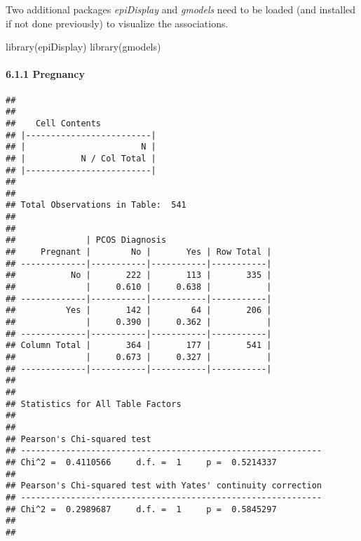 \documentclass[
]{article}
\newenvironment{Shaded}{\begin{snugshade}}{\end{snugshade}}
\newcommand{\AttributeTok}[1]{\textcolor[rgb]{0.77,0.63,0.00}{#1}}
\newcommand{\CommentTok}[1]{\textcolor[rgb]{0.56,0.35,0.01}{\textit{#1}}}
\newcommand{\ConstantTok}[1]{\textcolor[rgb]{0.00,0.00,0.00}{#1}}
\newcommand{\FloatTok}[1]{\textcolor[rgb]{0.00,0.00,0.81}{#1}}
\newcommand{\FunctionTok}[1]{\textcolor[rgb]{0.00,0.00,0.00}{#1}}
\newcommand{\NormalTok}[1]{#1}
\newcommand{\OtherTok}[1]{\textcolor[rgb]{0.56,0.35,0.01}{#1}}
\newcommand{\SpecialCharTok}[1]{\textcolor[rgb]{0.00,0.00,0.00}{#1}}
\newcommand{\StringTok}[1]{\textcolor[rgb]{0.31,0.60,0.02}{#1}}
\begin{document}
Two additional packages \emph{epiDisplay} and \emph{gmodels} need to be
loaded (and installed if not done previously) to visualize the
associations.

\begin{Shaded}
\begin{Highlighting}[]
\FunctionTok{library}\NormalTok{(epiDisplay)}
\FunctionTok{library}\NormalTok{(gmodels)}
\end{Highlighting}
\end{Shaded}

\hypertarget{pregnancy}{%
\paragraph{6.1.1 Pregnancy}\label{pregnancy}}

\begin{Shaded}
\end{Shaded}

\begin{verbatim}
## 
##  
##    Cell Contents
## |-------------------------|
## |                       N |
## |           N / Col Total |
## |-------------------------|
## 
##  
## Total Observations in Table:  541 
## 
##  
##              | PCOS Diagnosis 
##     Pregnant |        No |       Yes | Row Total | 
## -------------|-----------|-----------|-----------|
##           No |       222 |       113 |       335 | 
##              |     0.610 |     0.638 |           | 
## -------------|-----------|-----------|-----------|
##          Yes |       142 |        64 |       206 | 
##              |     0.390 |     0.362 |           | 
## -------------|-----------|-----------|-----------|
## Column Total |       364 |       177 |       541 | 
##              |     0.673 |     0.327 |           | 
## -------------|-----------|-----------|-----------|
## 
##  
## Statistics for All Table Factors
## 
## 
## Pearson's Chi-squared test 
## ------------------------------------------------------------
## Chi^2 =  0.4110566     d.f. =  1     p =  0.5214337 
## 
## Pearson's Chi-squared test with Yates' continuity correction 
## ------------------------------------------------------------
## Chi^2 =  0.2989687     d.f. =  1     p =  0.5845297 
## 
## 
\end{verbatim}
\end{document}
